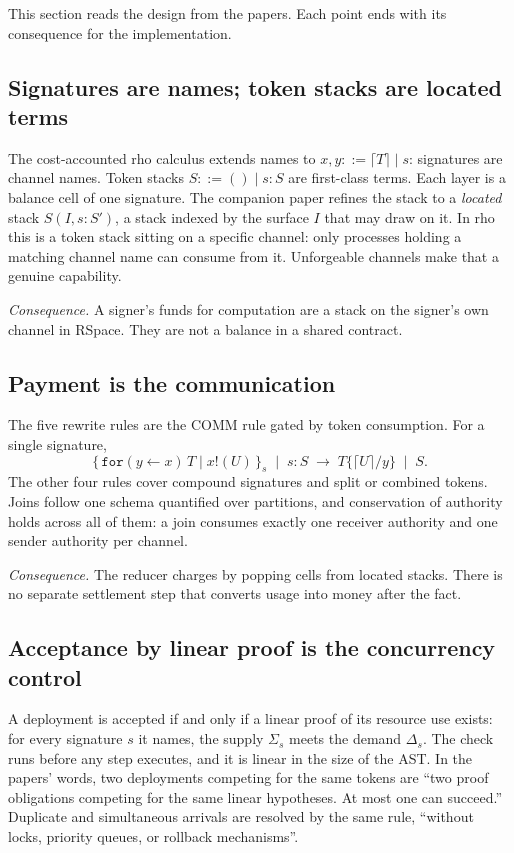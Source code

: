 \documentclass[11pt]{article}
\begin{document}
This section reads the design from the papers. Each point ends with its consequence for the implementation.

\subsection{Signatures are names; token stacks are located terms}

The cost-accounted rho calculus extends names to $x, y ::= \lceil T \rceil \mid s$: signatures are channel names. Token stacks $S ::= () \mid s : S$ are first-class terms. Each layer is a balance cell of one signature. The companion paper refines the stack to a \emph{located} stack $S(I, s : S')$, a stack indexed by the surface $I$ that may draw on it. In rho this is a token stack sitting on a specific channel: only processes holding a matching channel name can consume from it. Unforgeable channels make that a genuine capability.

\emph{Consequence.} A signer's funds for computation are a stack on the signer's own channel in RSpace. They are not a balance in a shared contract.

\subsection{Payment is the communication}

The five rewrite rules are the COMM rule gated by token consumption. For a single signature,
\[
\{\, \mathtt{for}(y \leftarrow x)\,T \mid x!(U) \,\}_s \;\mid\; s : S \;\longrightarrow\; T\{\lceil U\rceil/y\} \;\mid\; S .
\]
The other four rules cover compound signatures and split or combined tokens. Joins follow one schema quantified over partitions, and conservation of authority holds across all of them: a join consumes exactly one receiver authority and one sender authority per channel.

\emph{Consequence.} The reducer charges by popping cells from located stacks. There is no separate settlement step that converts usage into money after the fact.

\subsection{Acceptance by linear proof is the concurrency control}

A deployment is accepted if and only if a linear proof of its resource use exists: for every signature $s$ it names, the supply $\Sigma_s$ meets the demand $\Delta_s$. The check runs before any step executes, and it is linear in the size of the AST. In the papers' words, two deployments competing for the same tokens are ``two proof obligations competing for the same linear hypotheses. At most one can succeed.'' Duplicate and simultaneous arrivals are resolved by the same rule, ``without locks, priority queues, or rollback mechanisms''.
\end{document}
